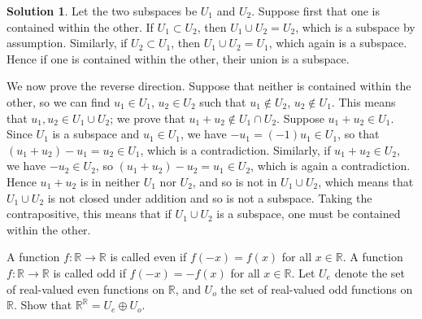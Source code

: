 \documentclass[12pt]{article}
\theoremstyle{definition}
\theoremstyle{definition}
\newtheorem*{soln}{Solution}
\newcommand{\R}{\mathbb{R}}
\begin{document}
\begin{soln}
Let the two subspaces be $U_1$ and $U_2$. Suppose first that one is contained within the other. If $U_1\subset U_2$, then $U_1\cup U_2=U_2$, which is a subspace by assumption. Similarly, if $U_2\subset U_1$, then $U_1\cup U_2=U_1$, which again is a subspace. Hence if one is contained within the other, their union is a subspace.

We now prove the reverse direction. Suppose that neither is contained within the other, so we can find $u_1\in U_1$, $u_2\in U_2$ such that $u_1\notin U_2$, $u_2\notin U_1$. This means that $u_1,u_2\in U_1\cup U_2$; we prove that $u_1+u_2\notin U_1\cap U_2$. Suppose $u_1+u_2\in U_1$. Since $U_1$ is a subspace and $u_1\in U_1$, we have $-u_1=(-1)u_1\in U_1$, so that $(u_1+u_2)-u_1=u_2\in U_1$, which is a contradiction. Similarly, if $u_1+u_2\in U_2$, we have $-u_2\in U_2$, so $(u_1+u_2)-u_2=u_1\in U_2$, which is again a contradiction. Hence $u_1+u_2$ is in neither $U_1$ nor $U_2$, and so is not in $U_1\cup U_2$, which means that $U_1\cup U_2$ is not closed under addition and so is not a subspace. Taking the contrapositive, this means that if $U_1\cup U_2$ is a subspace, one must be contained within the other.
\end{soln}

\begin{prob}[Cf. Axler 1.C.24.]
A function $f:\R\to\R$ is called even if $f(-x)=f(x)$ for all $x\in\R$. A function $f:\R\to\R$ is called odd if $f(-x)=-f(x)$ for all $x\in\R$. Let $U_e$ denote the set of real-valued even functions on $\R$, and $U_o$ the set of real-valued odd functions on $\R$. Show that $\R^\R=U_e\oplus U_o$.
\end{prob}
\end{document}
